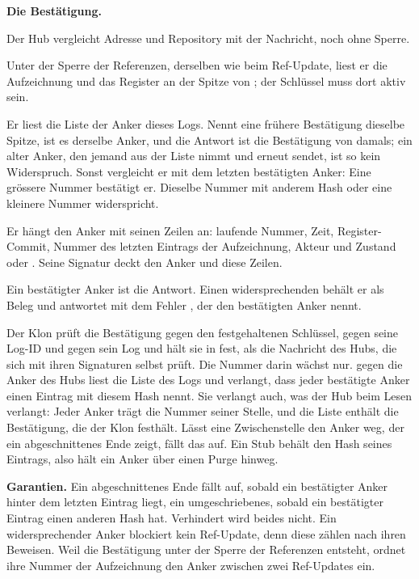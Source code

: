 {\bf Die Bestätigung.}
\startitemize[n]
\item Der Hub vergleicht Adresse und Repository mit der Nachricht, noch ohne Sperre.
\item Unter der Sperre der Referenzen, derselben wie beim Ref-Update, liest er die Aufzeichnung
und das Register an der Spitze von ; der Schlüssel muss dort aktiv sein.
\item Er liest die Liste der Anker dieses Logs.
Nennt eine frühere Bestätigung dieselbe Spitze, ist es derselbe Anker, und die Antwort ist die
Bestätigung von damals; ein alter Anker, den jemand aus der Liste nimmt und erneut sendet, ist
so kein Widerspruch.
Sonst vergleicht er mit dem letzten bestätigten Anker: Eine grössere Nummer bestätigt er.
Dieselbe Nummer mit anderem Hash oder eine kleinere Nummer widerspricht.
\item Er hängt den Anker mit seinen Zeilen an: laufende Nummer, Zeit, Register-Commit, Nummer des
letzten Eintrags der Aufzeichnung, Akteur und Zustand  oder .
Seine Signatur deckt den Anker und diese Zeilen.
\item Ein bestätigter Anker ist die Antwort.
Einen widersprechenden behält er als Beleg und antwortet mit dem Fehler
, der den bestätigten Anker nennt.
\stopitemize

Der Klon prüft die Bestätigung gegen den festgehaltenen Schlüssel, gegen seine Log-ID und gegen
sein Log und hält sie in  fest, als die Nachricht des Hubs, die sich mit
ihren Signaturen selbst prüft.
Die Nummer darin wächst nur.
 gegen die Anker des Hubs liest die Liste des Logs und verlangt, dass jeder
bestätigte Anker einen Eintrag mit diesem Hash nennt.
Sie verlangt auch, was der Hub beim Lesen verlangt: Jeder Anker trägt die Nummer seiner Stelle,
und die Liste enthält die Bestätigung, die der Klon festhält.
Lässt eine Zwischenstelle den Anker weg, der ein abgeschnittenes Ende zeigt, fällt das auf.
Ein Stub behält den Hash seines Eintrags, also hält ein Anker über einen Purge hinweg.

{\bf Garantien.}
Ein abgeschnittenes Ende fällt auf, sobald ein bestätigter Anker hinter dem letzten Eintrag liegt,
ein umgeschriebenes, sobald ein bestätigter Eintrag einen anderen Hash hat.
Verhindert wird beides nicht.
Ein widersprechender Anker blockiert kein Ref-Update, denn diese zählen nach ihren Beweisen.
Weil die Bestätigung unter der Sperre der Referenzen entsteht, ordnet ihre Nummer der
Aufzeichnung den Anker zwischen zwei Ref-Updates ein.

